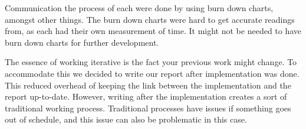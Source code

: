Communication the process of each \localgroup[] were done by using burn down charts, amongst other things.
The burn down charts were hard to get accurate readings from, as each \localgroup[] had their own measurement of time.
It might not be needed to have burn down charts for further development. 

The essence of working iterative is the fact your previous work might change.
To accommodate this we decided to write our report after implementation was done. This reduced overhead of keeping the link between the implementation and the report up-to-date.
However, writing after the implementation creates a sort of traditional working process.
Traditional processes have issues if something goes out of schedule, and this issue can also be problematic in this case.

